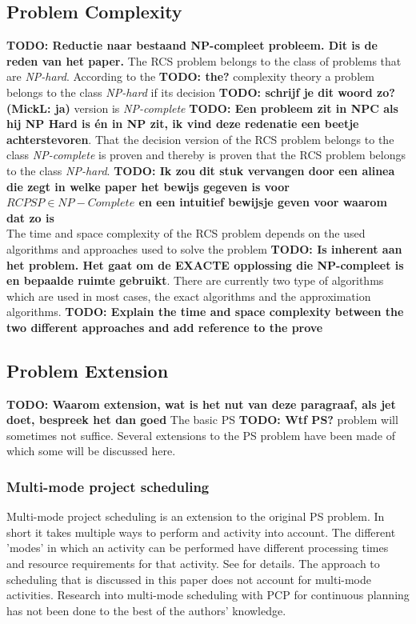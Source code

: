 \documentclass{article}
\newcommand{\TODO}[1]{{\color{red}\textbf{TODO: #1}}}
\begin{document}
\subsection{Problem Complexity}
\TODO{Reductie naar bestaand NP-compleet probleem. Dit is de reden van het paper.}
The RCS problem belongs to the class of problems that are \emph{NP-hard}. According to the \TODO{the?} complexity theory a problem belongs to the class \emph{NP-hard} if its decision \TODO{schrijf je dit woord zo? (MickL: ja)} version is \emph{NP-complete} \TODO{Een probleem zit in NPC als hij NP Hard is én in NP zit, ik vind deze redenatie een beetje achterstevoren}. That the decision version of the RCS problem belongs to the class \emph{NP-complete} is proven and thereby is proven that the RCS problem belongs to the class \emph{NP-hard}. \TODO{Ik zou dit stuk vervangen door een alinea die zegt in welke paper het bewijs gegeven is voor $RCPSP \in NP-Complete$ en een intuitief bewijsje geven voor waarom dat zo is}\\
The time and space complexity of the RCS problem depends on the used algorithms and approaches used to solve the problem \TODO{Is inherent aan het problem. Het gaat om de EXACTE opplossing die NP-compleet is en bepaalde ruimte gebruikt}. There are currently two type of algorithms which are used in most cases, the exact algorithms and the approximation algorithms.
\TODO{Explain the time and space complexity between the two different approaches and add reference to the prove}

\subsection{Problem Extension}\TODO{Waarom extension, wat is het nut van deze paragraaf, als jet doet, bespreek het dan goed}
The basic PS \TODO{Wtf PS?} problem will sometimes not suffice. Several extensions to the PS problem have been made of which some will be discussed here. 

\subsubsection{Multi-mode project scheduling}
Multi-mode project scheduling is an extension to the original PS problem. In short it takes multiple ways to perform and activity into account. The different 'modes' in which an activity can be performed have different processing times and resource requirements for that activity. See \citet{herroelen05} for details. The approach to scheduling that is discussed in this paper does not account for multi-mode activities. Research into multi-mode scheduling with PCP for continuous planning has not been done to the best of the authors' knowledge. 
\end{document}
